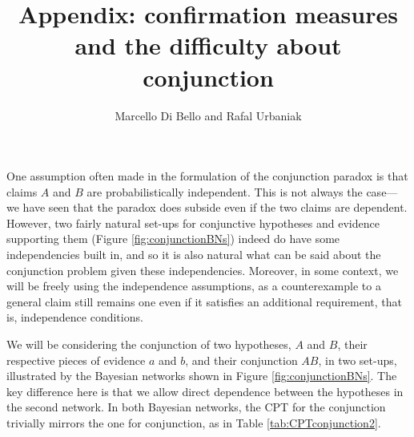 \documentclass[
  10pt,
  dvipsnames,enabledeprecatedfontcommands]{scrartcl}
\title{Appendix: confirmation measures and the difficulty about
conjunction}
\author{Marcello Di Bello and Rafal Urbaniak}
\date{}
\begin{document}
\maketitle

One assumption often made in the formulation of the conjunction paradox
is that claims \(A\) and \(B\) are probabilistically independent. This
is not always the case---we have seen that the paradox does subside even
if the two claims are dependent. However, two fairly natural set-ups for
conjunctive hypotheses and evidence supporting them (Figure
\ref{fig:conjunctionBNs}) indeed do have some independencies built in,
and so it is also natural what can be said about the conjunction problem
given these independencies. Moreover, in some context, we will be freely
using the independence assumptions, as a counterexample to a general
claim still remains one even if it satisfies an additional requirement,
that is, independence conditions.

We will be considering the conjunction of two hypotheses, \(A\) and
\(B\), their respective pieces of evidence \(a\) and \(b\), and their
conjunction \(AB\), in two set-ups, illustrated by the Bayesian networks
shown in Figure \ref{fig:conjunctionBNs}. The key difference here is
that we allow direct dependence between the hypotheses in the second
network. In both Bayesian networks, the CPT for the conjunction
trivially mirrors the one for conjunction, as in Table
\ref{tab:CPTconjunction2}.

\vspace{1mm}
\footnotesize

\normalsize
\end{document}
